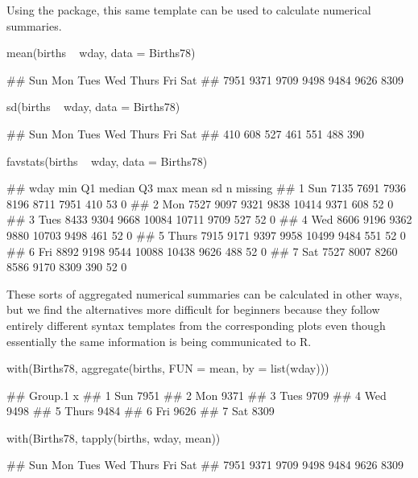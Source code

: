 \noindent
Using the  package, this same template can be used to
calculate numerical summaries.

\begin{Schunk}
\begin{Sinput}
mean(births ~ wday, data = Births78)
\end{Sinput}
\begin{Soutput}
##   Sun   Mon  Tues   Wed Thurs   Fri   Sat 
##  7951  9371  9709  9498  9484  9626  8309
\end{Soutput}
\begin{Sinput}
sd(births ~ wday, data = Births78)
\end{Sinput}
\begin{Soutput}
##   Sun   Mon  Tues   Wed Thurs   Fri   Sat 
##   410   608   527   461   551   488   390
\end{Soutput}
\begin{Sinput}
favstats(births ~ wday, data = Births78)
\end{Sinput}
\begin{Soutput}
##    wday  min   Q1 median    Q3   max mean  sd  n missing
## 1   Sun 7135 7691   7936  8196  8711 7951 410 53       0
## 2   Mon 7527 9097   9321  9838 10414 9371 608 52       0
## 3  Tues 8433 9304   9668 10084 10711 9709 527 52       0
## 4   Wed 8606 9196   9362  9880 10703 9498 461 52       0
## 5 Thurs 7915 9171   9397  9958 10499 9484 551 52       0
## 6   Fri 8892 9198   9544 10088 10438 9626 488 52       0
## 7   Sat 7527 8007   8260  8586  9170 8309 390 52       0
\end{Soutput}
\end{Schunk}

\noindent
These sorts of aggregated numerical summaries can be calculated in other
ways, but we find the alternatives more difficult for beginners because
they follow entirely different syntax templates from the corresponding
plots even though essentially the same information is being communicated
to R.

\begin{Schunk}
\begin{Sinput}
with(Births78, aggregate(births, FUN = mean, by = list(wday)))
\end{Sinput}
\begin{Soutput}
##   Group.1    x
## 1     Sun 7951
## 2     Mon 9371
## 3    Tues 9709
## 4     Wed 9498
## 5   Thurs 9484
## 6     Fri 9626
## 7     Sat 8309
\end{Soutput}
\begin{Sinput}
with(Births78, tapply(births, wday, mean))
\end{Sinput}
\begin{Soutput}
##   Sun   Mon  Tues   Wed Thurs   Fri   Sat 
##  7951  9371  9709  9498  9484  9626  8309
\end{Soutput}
\end{Schunk}

